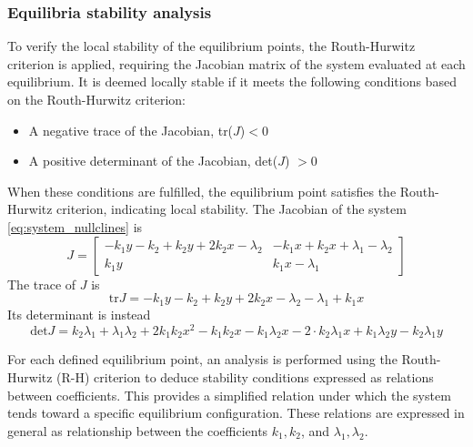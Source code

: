 \subsubsection{Equilibria stability analysis}
To verify the local stability of the equilibrium points, the Routh-Hurwitz criterion is applied, requiring the Jacobian matrix of the system evaluated at each equilibrium. It is deemed locally stable if it meets the following conditions based on the Routh-Hurwitz criterion:
\begin{itemize}
	\item A negative trace of the Jacobian, tr($J$)$< 0$
	\item A positive determinant of the Jacobian, det($J$) $> 0$
\end{itemize}
When these conditions are fulfilled, the equilibrium point satisfies the Routh-Hurwitz criterion, indicating local stability.
The Jacobian of the system \ref{eq:system_nullclines} is
\begin{equation}
	J = \begin{bmatrix}
		-k_1 y -k_2 +k_2 y+2 k_2 x- \lambda_2 & -k_1 x + k_2 x + \lambda_1-\lambda_2 \\
		k_1 y & k_1 x - \lambda_1
	\end{bmatrix}
\end{equation}
The trace of $J$ is
\begin{equation}
	\text{tr}J = -k_1 y -k_2 +k_2y + 2 k_2 x - \lambda_2 -\lambda_1 +k_1 x
\end{equation}
Its determinant is instead
\begin{equation}
	\text{det}J = k_2 \lambda_1 + \lambda_1 \lambda_2 + 2 k_1 k_2 x^2 - k_1 k_2 x - k_1 \lambda_2 x - 2\cdot k_2 \lambda_1 x + k_1 \lambda_2 y - k_2 \lambda_1 y
\end{equation}

For each defined equilibrium point, an analysis is performed using the Routh-Hurwitz (R-H) criterion to deduce stability conditions expressed as relations between coefficients. This provides a simplified relation under which the system tends toward a specific equilibrium configuration. These relations are expressed in general as relationship between the coefficients $k_1, k_2$, and $\lambda_1, \lambda_2$.

